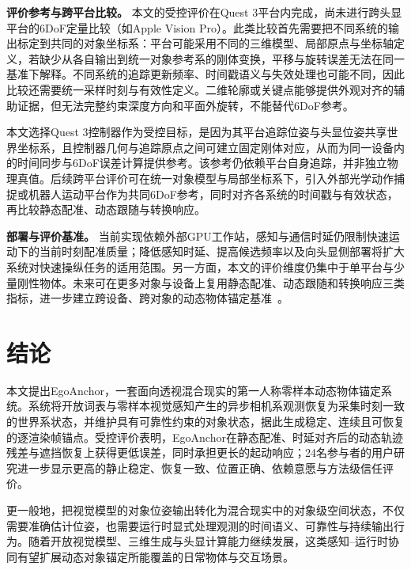 \documentclass[review]{vgtc}
\begin{document}
\textbf{评价参考与跨平台比较。}
本文的受控评价在Quest 3平台内完成，尚未进行跨头显平台的6DoF定量比较（如Apple Vision Pro）。此类比较首先需要把不同系统的输出标定到共同的对象坐标系：平台可能采用不同的三维模型、局部原点与坐标轴定义，若缺少从各自输出到统一对象参考系的刚体变换，平移与旋转误差无法在同一基准下解释。不同系统的追踪更新频率、时间戳语义与失效处理也可能不同，因此比较还需要统一采样时刻与有效性定义。二维轮廓或关键点能够提供外观对齐的辅助证据，但无法完整约束深度方向和平面外旋转，不能替代6DoF参考。

本文选择Quest 3控制器作为受控目标，是因为其平台追踪位姿与头显位姿共享世界坐标系，且控制器几何与追踪原点之间可建立固定刚体对应，从而为同一设备内的时间同步与6DoF误差计算提供参考。该参考仍依赖平台自身追踪，并非独立物理真值。后续跨平台评价可在统一对象模型与局部坐标系下，引入外部光学动作捕捉或机器人运动平台作为共同6DoF参考，同时对齐各系统的时间戳与有效状态，再比较静态配准、动态跟随与转换响应。

\textbf{部署与评价基准。}
当前实现依赖外部GPU工作站，感知与通信时延仍限制快速运动下的当前时刻配准质量；降低感知时延、提高候选频率以及向头显侧部署将扩大系统对快速操纵任务的适用范围。另一方面，本文的评价维度仍集中于单平台与少量刚性物体。未来可在更多对象与设备上复用静态配准、动态跟随和转换响应三类指标，进一步建立跨设备、跨对象的动态物体锚定基准~\cite{cheng2024tracking,hu2024applemeta,hu2025xrrealitycheck}。

\section{结论}\label{sec:conclusion}

本文提出EgoAnchor，一套面向透视混合现实的第一人称零样本动态物体锚定系统。系统将开放词表与零样本视觉感知产生的异步相机系观测恢复为采集时刻一致的世界系状态，并维护具有可靠性约束的对象状态，据此生成稳定、连续且可恢复的逐渲染帧锚点。受控评价表明，EgoAnchor在静态配准、时延对齐后的动态轨迹残差与遮挡恢复上获得更低误差，同时承担更长的起动响应；24名参与者的用户研究进一步显示更高的静止稳定、恢复一致、位置正确、依赖意愿与方法级信任评价。

更一般地，把视觉模型的对象位姿输出转化为混合现实中的对象级空间状态，不仅需要准确估计位姿，也需要运行时显式处理观测的时间语义、可靠性与持续输出行为。随着开放视觉模型、三维生成与头显计算能力继续发展，这类感知--运行时协同有望扩展动态对象锚定所能覆盖的日常物体与交互场景。

\raggedbottom



\end{document}
